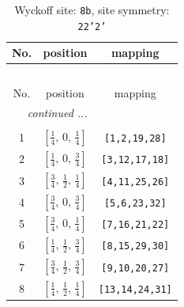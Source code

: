 \documentclass[fleqn,8pt]{jsarticle}
\begin{document}
\begin{longtable}{ccc}
\caption{Wyckoff site: {\tt 8b}, site symmetry: {\tt 22'2'}}
 \\
 \hline \hline
No. & position & mapping \\ \hline \endfirsthead

\multicolumn{2}{l}{\tablename\ \thetable{}} \\
 \hline \hline
No. & position & mapping \\ \hline \endhead

 \hline \hline
\multicolumn{2}{r}{\footnotesize\it continued ...} \\ \endfoot

 \hline \hline
\multicolumn{2}{r}{} \\ \endlastfoot

1 & $\left[ \frac{1}{4},\, 0,\, \frac{1}{4} \right]$ & {\tt [1,2,19,28]} \\ \hline
2 & $\left[ \frac{1}{4},\, 0,\, \frac{3}{4} \right]$ & {\tt [3,12,17,18]} \\ \hline
3 & $\left[ \frac{3}{4},\, \frac{1}{2},\, \frac{1}{4} \right]$ & {\tt [4,11,25,26]} \\ \hline
4 & $\left[ \frac{3}{4},\, 0,\, \frac{3}{4} \right]$ & {\tt [5,6,23,32]} \\ \hline
5 & $\left[ \frac{3}{4},\, 0,\, \frac{1}{4} \right]$ & {\tt [7,16,21,22]} \\ \hline
6 & $\left[ \frac{1}{4},\, \frac{1}{2},\, \frac{3}{4} \right]$ & {\tt [8,15,29,30]} \\ \hline
7 & $\left[ \frac{3}{4},\, \frac{1}{2},\, \frac{3}{4} \right]$ & {\tt [9,10,20,27]} \\ \hline
8 & $\left[ \frac{1}{4},\, \frac{1}{2},\, \frac{1}{4} \right]$ & {\tt [13,14,24,31]} \\
\end{longtable}
\renewcommand{\arraystretch}{1.2}
\end{document}

